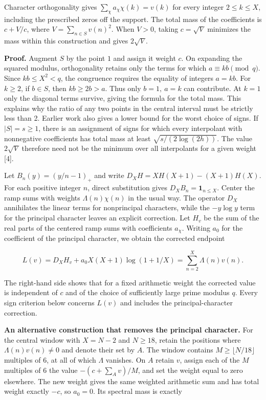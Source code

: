 \documentclass[11pt,a4paper]{article}
\begin{document}
Character orthogonality gives $\sum_\chi a_\chi\chi(k)=v(k)$ for every integer $2\le k\le X$, including the prescribed zeros off the support. The total mass of the coefficients is $c+V/c$, where $V=\sum_{n\in S}v(n)^2$. When $V>0$, taking $c=\sqrt V$ minimizes the mass within this construction and gives $2\sqrt V$.

\textbf{Proof.} Augment $S$ by the point $1$ and assign it weight $c$. On expanding the squared modulus, orthogonality retains only the terms for which $a\equiv kb\pmod q$. Since $kb\le X^2<q$, the congruence requires the equality of integers $a=kb$. For $k\ge2$, if $b\in S$, then $kb\ge2b>a$. Thus only $b=1,\ a=k$ can contribute. At $k=1$ only the diagonal terms survive, giving the formula for the total mass. This explains why the ratio of any two points in the central interval must be strictly less than 2. Earlier work also gives a lower bound for the worst choice of signs. If $|S|=s\ge1$, there is an assignment of signs for which every interpolant with nonnegative coefficients has total mass at least $\sqrt{s/(2\log(2h))}$. The value $2\sqrt V$ therefore need not be the minimum over all interpolants for a given weight [4].

Let $B_n(y)=(y/n-1)_+$ and write $D_XH=XH(X+1)-(X+1)H(X)$. For each positive integer $n$, direct substitution gives $D_X B_n=\mathbf{1}_{n\le X}$. Center the ramp sums with weights $\Lambda(n)\chi(n)$ in the usual way. The operator $D_X$ annihilates the linear terms for nonprincipal characters, while the $-y\log y$ term for the principal character leaves an explicit correction. Let $H_v$ be the sum of the real parts of the centered ramp sums with coefficients $a_\chi$. Writing $a_0$ for the coefficient of the principal character, we obtain the corrected endpoint

\[
L(v)=D_XH_v+a_0 X(X+1)\log(1+1/X)=\sum_{n=2}^{X}\Lambda(n)v(n).
\]

The right-hand side shows that for a fixed arithmetic weight the corrected value is independent of $c$ and of the choice of sufficiently large prime modulus $q$. Every sign criterion below concerns $L(v)$ and includes the principal-character correction.

\textbf{An alternative construction that removes the principal character.} For the central window with $X=N-2$ and $N\ge18$, retain the positions where $\Lambda(n)v(n)\ne0$ and denote their set by $A$. The window contains $M\ge\lfloor N/18\rfloor$ multiples of 6, at all of which $\Lambda$ vanishes. On $A$ retain $v$, assign each of the $M$ multiples of 6 the value $-(c+\sum_Av)/M$, and set the weight equal to zero elsewhere. The new weight gives the same weighted arithmetic sum and has total weight exactly $-c$, so $a_0=0$. Its spectral mass is exactly
\end{document}
